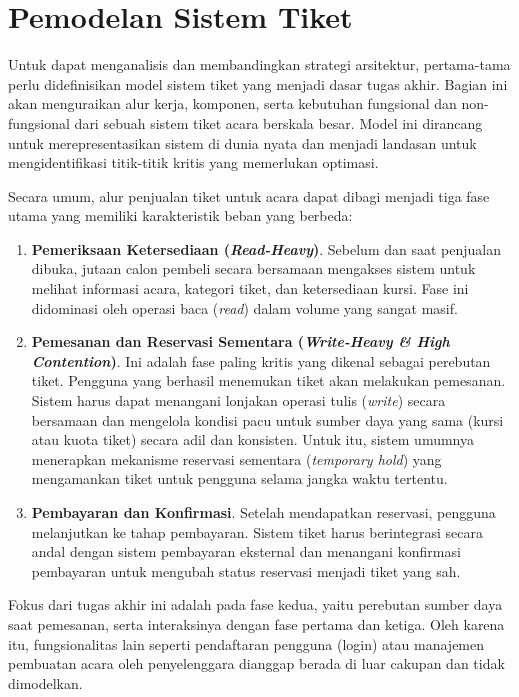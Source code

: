 \section{Pemodelan Sistem Tiket}
\label{apx:analisis-kebutuhan}

Untuk dapat menganalisis dan membandingkan strategi arsitektur, pertama-tama perlu didefinisikan model sistem tiket yang menjadi dasar tugas akhir. Bagian ini akan menguraikan alur kerja, komponen, serta kebutuhan fungsional dan non-fungsional dari sebuah sistem tiket acara berskala besar. Model ini dirancang untuk merepresentasikan sistem di dunia nyata dan menjadi landasan untuk mengidentifikasi titik-titik kritis yang memerlukan optimasi.

Secara umum, alur penjualan tiket untuk acara dapat dibagi menjadi tiga fase utama yang memiliki karakteristik beban yang berbeda:

\begin{enumerate}
    \item \textbf{Pemeriksaan Ketersediaan (\textit{Read-Heavy})}. Sebelum dan saat penjualan dibuka, jutaan calon pembeli secara bersamaan mengakses sistem untuk melihat informasi acara, kategori tiket, dan ketersediaan kursi. Fase ini didominasi oleh operasi baca (\textit{read}) dalam volume yang sangat masif.
    \item \textbf{Pemesanan dan Reservasi Sementara (\textit{Write-Heavy \& High Contention})}. Ini adalah fase paling kritis yang dikenal sebagai perebutan tiket. Pengguna yang berhasil menemukan tiket akan melakukan pemesanan. Sistem harus dapat menangani lonjakan operasi tulis (\textit{write}) secara bersamaan dan mengelola kondisi pacu untuk sumber daya yang sama (kursi atau kuota tiket) secara adil dan konsisten. Untuk itu, sistem umumnya menerapkan mekanisme reservasi sementara (\textit{temporary hold}) yang mengamankan tiket untuk pengguna selama jangka waktu tertentu.
    \item \textbf{Pembayaran dan Konfirmasi}. Setelah mendapatkan reservasi, pengguna melanjutkan ke tahap pembayaran. Sistem tiket harus berintegrasi secara andal dengan sistem pembayaran eksternal dan menangani konfirmasi pembayaran untuk mengubah status reservasi menjadi tiket yang sah.
\end{enumerate}

Fokus dari tugas akhir ini adalah pada fase kedua, yaitu perebutan sumber daya saat pemesanan, serta interaksinya dengan fase pertama dan ketiga. Oleh karena itu, fungsionalitas lain seperti pendaftaran pengguna (login) atau manajemen pembuatan acara oleh penyelenggara dianggap berada di luar cakupan dan tidak dimodelkan.

